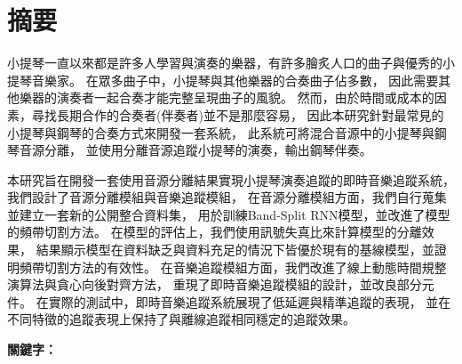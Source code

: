 \documentclass[class=NCU_thesis, crop=false]{standalone}
\begin{document}
\chapter{摘要}
小提琴一直以來都是許多人學習與演奏的樂器，有許多膾炙人口的曲子與優秀的小提琴音樂家。
在眾多曲子中，小提琴與其他樂器的合奏曲子佔多數，
因此需要其他樂器的演奏者一起合奏才能完整呈現曲子的風貌。
然而，由於時間或成本的因素，尋找長期合作的合奏者(伴奏者)並不是那麼容易，
因此本研究針對最常見的小提琴與鋼琴的合奏方式來開發一套系統，
此系統可將混合音源中的小提琴與鋼琴音源分離，
並使用分離音源追蹤小提琴的演奏，輸出鋼琴伴奏。

本研究旨在開發一套使用音源分離結果實現小提琴演奏追蹤的即時音樂追蹤系統，
我們設計了音源分離模組與音樂追蹤模組，
在音源分離模組方面，我們自行蒐集並建立一套新的公開整合資料集，
用於訓練Band-Split RNN模型，並改進了模型的頻帶切割方法。
在模型的評估上，我們使用訊號失真比來計算模型的分離效果，
結果顯示模型在資料缺乏與資料充足的情況下皆優於現有的基線模型，並證明頻帶切割方法的有效性。
在音樂追蹤模組方面，我們改進了線上動態時間規整演算法與貪心向後對齊方法，
重現了即時音樂追蹤模組的設計，並改良部分元件。
在實際的測試中，即時音樂追蹤系統展現了低延遲與精準追蹤的表現，
並在不同特徵的追蹤表現上保持了與離線追蹤相同穩定的追蹤效果。


\vspace{2em}
\noindent \textbf{關鍵字：} \keywordsZh{} %
\end{document}
